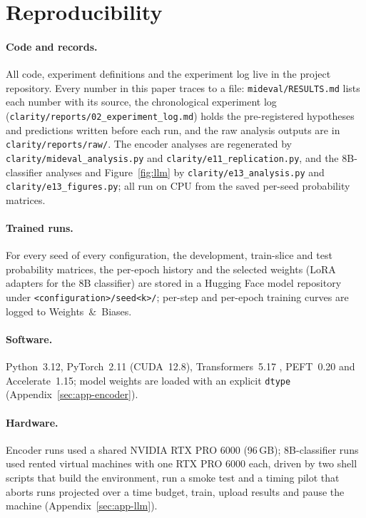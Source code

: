 \section{Reproducibility}
\label{sec:app-repro}

\paragraph{Code and records.}
All code, experiment definitions and the experiment log live in the project repository.
Every number in this paper traces to a file: \texttt{mideval/RESULTS.md} lists each number with its source, the chronological experiment log (\texttt{clarity/reports/02\_experiment\_log.md}) holds the pre-registered hypotheses and predictions written before each run, and the raw analysis outputs are in \texttt{clarity/reports/raw/}.
The encoder analyses are regenerated by \texttt{clarity/mideval\_analysis.py} and \texttt{clarity/e11\_replication.py}, and the 8B-classifier analyses and Figure~\ref{fig:llm} by \texttt{clarity/e13\_analysis.py} and \texttt{clarity/e13\_figures.py}; all run on CPU from the saved per-seed probability matrices.

\paragraph{Trained runs.}
For every seed of every configuration, the development, train-slice and test probability matrices, the per-epoch history and the selected weights (LoRA adapters for the 8B classifier) are stored in a Hugging Face model repository under \texttt{<configuration>/seed<k>/}; per-step and per-epoch training curves are logged to Weights~\&~Biases.

\paragraph{Software.}
Python~3.12, PyTorch~2.11 (CUDA~12.8), Transformers~5.17 \citep{wolf-etal-2020-transformers}, PEFT~0.20 and Accelerate~1.15; model weights are loaded with an explicit \texttt{dtype} (Appendix~\ref{sec:app-encoder}).

\paragraph{Hardware.}
Encoder runs used a shared NVIDIA RTX PRO 6000 (96\,GB); 8B-classifier runs used rented virtual machines with one RTX PRO 6000 each, driven by two shell scripts that build the environment, run a smoke test and a timing pilot that aborts runs projected over a time budget, train, upload results and pause the machine (Appendix~\ref{sec:app-llm}).
